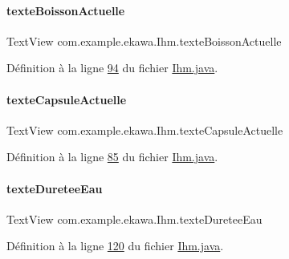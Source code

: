 \paragraph{\texorpdfstring{texte\+Boisson\+Actuelle}{texteBoissonActuelle}}
{\footnotesize\ttfamily Text\+View com.\+example.\+ekawa.\+Ihm.\+texte\+Boisson\+Actuelle\hspace{0.3cm}{\ttfamily [private]}}



Définition à la ligne \hyperlink{_ihm_8java_source_l00094}{94} du fichier \hyperlink{_ihm_8java_source}{Ihm.\+java}.

\mbox{\label{classcom_1_1example_1_1ekawa_1_1_ihm_a3a9c8a185607e09fed0df62e46925786}} 
\paragraph{\texorpdfstring{texte\+Capsule\+Actuelle}{texteCapsuleActuelle}}
{\footnotesize\ttfamily Text\+View com.\+example.\+ekawa.\+Ihm.\+texte\+Capsule\+Actuelle\hspace{0.3cm}{\ttfamily [private]}}



Définition à la ligne \hyperlink{_ihm_8java_source_l00085}{85} du fichier \hyperlink{_ihm_8java_source}{Ihm.\+java}.

\mbox{\label{classcom_1_1example_1_1ekawa_1_1_ihm_ac19dc1f761f988fcd51bbdb6f67a4009}} 
\paragraph{\texorpdfstring{texte\+Duretee\+Eau}{texteDureteeEau}}
{\footnotesize\ttfamily Text\+View com.\+example.\+ekawa.\+Ihm.\+texte\+Duretee\+Eau\hspace{0.3cm}{\ttfamily [private]}}



Définition à la ligne \hyperlink{_ihm_8java_source_l00120}{120} du fichier \hyperlink{_ihm_8java_source}{Ihm.\+java}.

